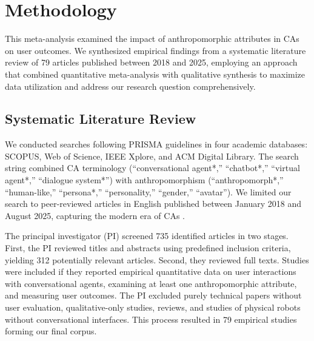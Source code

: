 \documentclass[manuscript,anonymous,sigconf]{acmart}
\begin{document}


\section{Methodology}

This meta-analysis examined the impact of anthropomorphic attributes in CAs on user outcomes. We synthesized empirical findings from a systematic literature review \cite{amin2025anthropomorphism} of 79 articles published between 2018 and 2025, employing an approach that combined quantitative meta-analysis with qualitative synthesis to maximize data utilization and address our research question comprehensively.

\subsection{Systematic Literature Review}

We conducted searches following PRISMA guidelines \cite{page_prisma_2021} in four academic databases: SCOPUS, Web of Science, IEEE Xplore, and ACM Digital Library. The search string combined CA terminology (``conversational agent*,'' ``chatbot*,'' ``virtual agent*,'' ``dialogue system*'') with anthropomorphism (``anthropomorph*,'' ``human-like,'' ``persona*,'' ``personality,'' ``gender,'' ``avatar''). We limited our search to peer-reviewed articles in English published between January 2018 and August 2025, capturing the modern era of CAs \cite{zhang2018personalizing}. %

The principal investigator (PI) screened 735 identified articles in two stages. First, the PI reviewed titles and abstracts using predefined inclusion criteria, yielding 312 potentially relevant articles. Second, they reviewed full texts. Studies were included if they reported empirical quantitative data on user interactions with conversational agents, examining at least one anthropomorphic attribute, and measuring user outcomes. The PI excluded purely technical papers without user evaluation, qualitative-only studies, reviews, and studies of physical robots without conversational interfaces. This process resulted in 79 empirical studies forming our final corpus.
\end{document}
